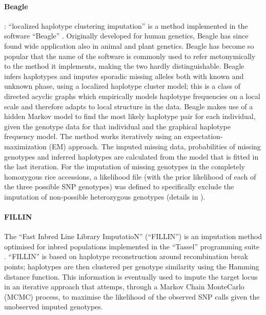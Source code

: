 \paragraph{Beagle}
\label{par:Beagle}
: ``localized haplotype clustering imputation'' is a method implemented in the software ``Beagle'' \cite{browning_rapid_2007}. Originally developed for human genetics, Beagle has since found wide application also in animal and plant genetics. Beagle has become so popular that the name of the software is commonly used  to refer metonymically to the method it implements, making the two hardly distinguishable. Beagle infers haplotypes and imputes sporadic missing alleles both with known and unknown phase, using a localized haplotype cluster model; this is a class of directed acyclic graphs which empirically models haplotype frequencies on a local scale and therefore adapts to local structure in the data. Beagle makes use of a hidden Markov model to find the most likely haplotype pair for each individual, given the genotype data for that individual and the graphical haplotype frequency model. The method works iteratively using an expectation-maximization (EM) approach. The imputed missing data, probabilities of missing genotypes and inferred haplotypes are calculated from the model that is fitted in the last iteration. For the imputation of missing genotypes in the completely homozygous rice accessions, a likelihood file (with the prior likelihood of each of the three possible SNP genotypes) was defined to specifically exclude the imputation of non-possible heterozygous genotypes (details in \cite{beagle3_manual}).

\paragraph{FILLIN}
The ``Fast Inbred Line Library ImputatioN'' (``FILLIN'') is an imputation method optimised for inbred populations implemented in the ``Tassel'' programming suite \cite{swarts_novel_2014}. ``FILLIN'' is based on haplotype reconstruction around recombination break points; haplotypes are then clustered per genotype similarity using the Hamming distance function. This information is eventually used to impute the target locus in an iterative approach that attemps, through a Markov Chain MonteCarlo (MCMC) process, to maximise the likelihood of the observed SNP calls given the unobserved imputed genotypes.

